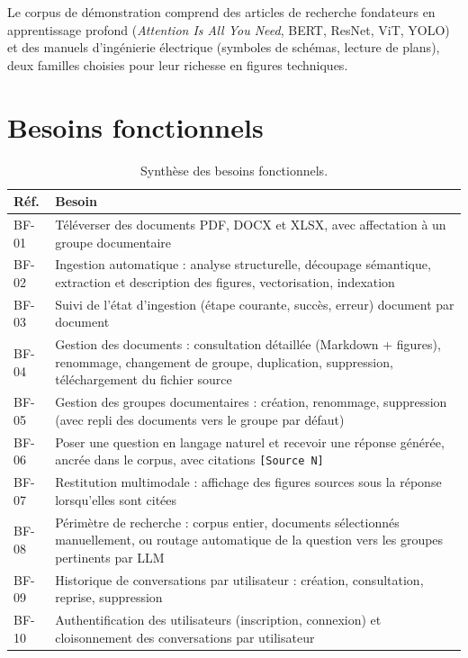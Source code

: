 Le corpus de démonstration comprend des articles de recherche fondateurs en apprentissage
profond (\emph{Attention Is All You Need}, BERT, ResNet, ViT, YOLO) et des manuels
d'ingénierie électrique (symboles de schémas, lecture de plans), deux familles choisies
pour leur richesse en figures techniques.

\section{Besoins fonctionnels}
\label{sec:besoins-fonctionnels}

\begin{table}[!htb]
\centering\small
\caption{Synthèse des besoins fonctionnels.}
\label{tab:bf}
\begin{tabularx}{\textwidth}{@{}lX@{}}
\toprule
\textbf{Réf.} & \textbf{Besoin} \\
\midrule
BF-01 & Téléverser des documents PDF, DOCX et XLSX, avec affectation à un groupe documentaire \\
BF-02 & Ingestion automatique : analyse structurelle, découpage sémantique, extraction et description des figures, vectorisation, indexation \\
BF-03 & Suivi de l'état d'ingestion (étape courante, succès, erreur) document par document \\
BF-04 & Gestion des documents : consultation détaillée (Markdown + figures), renommage, changement de groupe, duplication, suppression, téléchargement du fichier source \\
BF-05 & Gestion des groupes documentaires : création, renommage, suppression (avec repli des documents vers le groupe par défaut) \\
BF-06 & Poser une question en langage naturel et recevoir une réponse générée, ancrée dans le corpus, avec citations \texttt{[Source N]} \\
BF-07 & Restitution multimodale : affichage des figures sources sous la réponse lorsqu'elles sont citées \\
BF-08 & Périmètre de recherche : corpus entier, documents sélectionnés manuellement, ou routage automatique de la question vers les groupes pertinents par LLM \\
BF-09 & Historique de conversations par utilisateur : création, consultation, reprise, suppression \\
BF-10 & Authentification des utilisateurs (inscription, connexion) et cloisonnement des conversations par utilisateur \\
\bottomrule
\end{tabularx}
\end{table}

